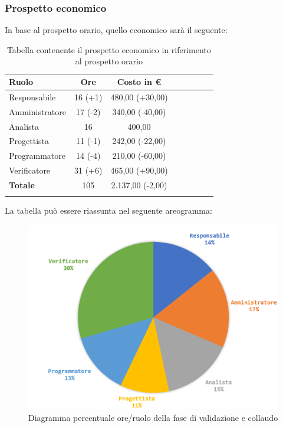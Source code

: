 		\subsubsection{Prospetto economico}
		In base al prospetto orario, quello economico sarà il seguente: 
		
		\begin{longtable}{|l|c|c|c|c|c|c|c|}
			\hline
			\rowcolor{lighter-grayer}
			\textbf{Ruolo} & \textbf{Ore} & \textbf{Costo in € } \\
			\hline
			\endfirsthead
			
			\hline
			Responsabile 	    & 16 (+1) & 480,00 (+30,00)\\
			\hline 
			\hline
			Amministratore	   & 17 (-2) & 340,00 (-40,00)\\
			\hline
			\hline
			Analista 				& 16 & 400,00\\
			\hline
			\hline
			Progettista 		   & 11 (-1) & 242,00 (-22,00)\\
			\hline
			\hline
			Programmatore 	  & 14 (-4) & 210,00 (-60,00)\\
			\hline
			\hline
			Verificatore 		   & 31 (+6) & 465,00 (+90,00)\\
			\hline
			\textbf{Totale} 	 & 105 & 2.137,00 (-2,00)\\
			\hline
			\caption{Tabella contenente il prospetto economico in riferimento al prospetto orario}
		\end{longtable}
		\pagebreak
		
		La tabella può essere riassunta nel seguente areogramma:
		\begin{figure}[H]
			\centering
			\includegraphics[width=0.8\linewidth]{./images/consuntivo/validCollCons2.png}
			\caption{Diagramma percentuale ore/ruolo della fase di validazione e collaudo}
			\label{fig:diagramma costi ruolo fase di validazione e collaudo}
		\end{figure}	
		
